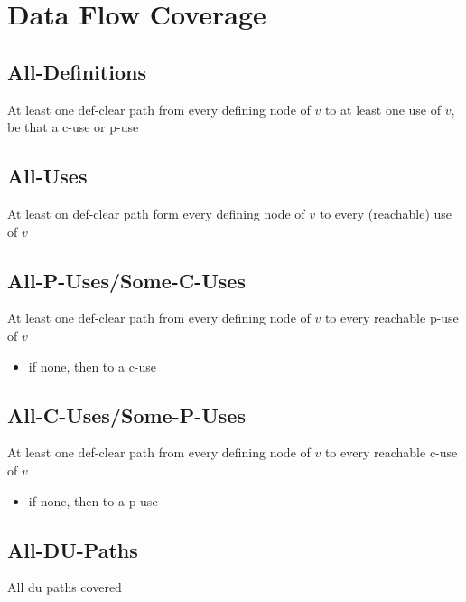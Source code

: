 \documentclass[11pt]{article}
\begin{document}
\section{Data Flow Coverage}
\label{sec:org6aa04d5}
\subsection{All-Definitions}
\label{sec:org8dc1ec6}
At least one def-clear path from every defining node of \(v\)
to at least one use of \(v\), be that a c-use or p-use
\subsection{All-Uses}
\label{sec:orge543e87}
At least on def-clear path form every defining node of \(v\)
to every (reachable) use of \(v\)
\subsection{All-P-Uses/Some-C-Uses}
\label{sec:org98a16d0}
At least one def-clear path from every defining node of \(v\)
to every reachable p-use of \(v\)
\begin{itemize}
\item if none, then to a c-use
\end{itemize}
\subsection{All-C-Uses/Some-P-Uses}
\label{sec:orgf10a37e}
At least one def-clear path from every defining node of \(v\)
to every reachable c-use of \(v\)
\begin{itemize}
\item if none, then to a p-use
\end{itemize}
\subsection{All-DU-Paths}
\label{sec:org5469d08}
All du paths covered
\end{document}

